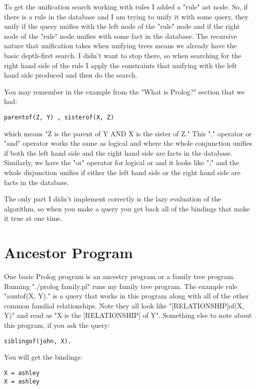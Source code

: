 \documentclass[a4paper, 12pt]{article}
\begin{document}
To get the unification search working with rules I added a "rule" ast node.
So, if there is a rule in the database and I am trying to unify it with some query, they unify if the query unifies with the left node of the "rule" node and if the right node of the "rule" node unifies with some fact in the database.
The recursive nature that unification takes when unifying trees means we already have the basic depth-first search. 
I didn't want to stop there, so when searching for the right hand side of the rule I apply the constraints that unifying with the left hand side produced and then do the search.

You may remember in the example from the "What is Prolog?" section that we had: 
\begin{verbatim}
parentof(Z, Y) , sisterof(X, Z) 
\end{verbatim}
which means "Z is the parent of Y AND X is the sister of Z."
This "," operator or "and" operator works the same as logical and where the whole conjunction unifies if both the left hand side and the right hand side are facts in the database.
Similarly, we have the "or" operator for logical or and it looks like ";" and the whole disjunction unifies if either the left hand side or the right hand side are facts in the database.

The only part I didn't implement correctly is the lazy evaluation of the algorithm, so when you make a query you get back all of the bindings that make it true at one time.

\section*{Ancestor Program}

One basic Prolog program is an ancestry program or a family tree program. 
Running "./prolog family.pl" runs my family tree program.
The example rule "auntof(X, Y)." is a query that works in this program along with all of the other common familial relationships.
Note they all look like "[RELATIONSHIP]of(X, Y)" and read as "X is the [RELATIONSHIP] of Y".
Something else to note about this program, if you ask the query:

\begin{verbatim}
siblingof(john, X).
\end{verbatim}

You will get the bindings:

\begin{verbatim}
X = ashley
X = ashley
\end{verbatim}
\end{document}
